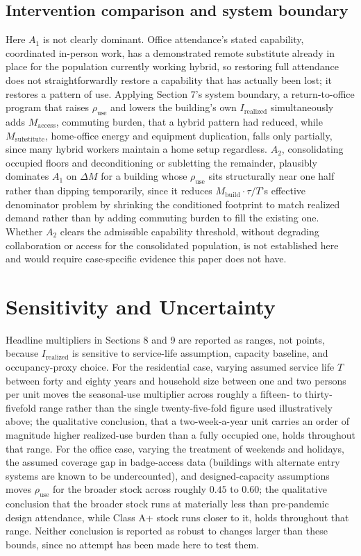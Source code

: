 \documentclass[11pt]{article}
\begin{document}
\subsection{Intervention comparison and system boundary}

Here $A_1$ is not clearly dominant. Office attendance's stated capability, coordinated in-person work, has a demonstrated remote substitute already in place for the population currently working hybrid, so restoring full attendance does not straightforwardly restore a capability that has actually been lost; it restores a pattern of use. Applying Section 7's system boundary, a return-to-office program that raises $\rho_{\text{use}}$ and lowers the building's own $I_{\text{realized}}$ simultaneously adds $M_{\text{access}}$, commuting burden, that a hybrid pattern had reduced, while $M_{\text{substitute}}$, home-office energy and equipment duplication, falls only partially, since many hybrid workers maintain a home setup regardless. $A_2$, consolidating occupied floors and deconditioning or subletting the remainder, plausibly dominates $A_1$ on $\Delta M$ for a building whose $\rho_{\text{use}}$ sits structurally near one half rather than dipping temporarily, since it reduces $M_{\text{build}}\cdot\tau/T$'s effective denominator problem by shrinking the conditioned footprint to match realized demand rather than by adding commuting burden to fill the existing one. Whether $A_2$ clears the admissible capability threshold, without degrading collaboration or access for the consolidated population, is not established here and would require case-specific evidence this paper does not have.

\section{Sensitivity and Uncertainty}

Headline multipliers in Sections 8 and 9 are reported as ranges, not points, because $I_{\text{realized}}$ is sensitive to service-life assumption, capacity baseline, and occupancy-proxy choice. For the residential case, varying assumed service life $T$ between forty and eighty years and household size between one and two persons per unit moves the seasonal-use multiplier across roughly a fifteen- to thirty-fivefold range rather than the single twenty-five-fold figure used illustratively above; the qualitative conclusion, that a two-week-a-year unit carries an order of magnitude higher realized-use burden than a fully occupied one, holds throughout that range. For the office case, varying the treatment of weekends and holidays, the assumed coverage gap in badge-access data (buildings with alternate entry systems are known to be undercounted), and designed-capacity assumptions moves $\rho_{\text{use}}$ for the broader stock across roughly $0.45$ to $0.60$; the qualitative conclusion that the broader stock runs at materially less than pre-pandemic design attendance, while Class A+ stock runs closer to it, holds throughout that range. Neither conclusion is reported as robust to changes larger than these bounds, since no attempt has been made here to test them.
\end{document}

